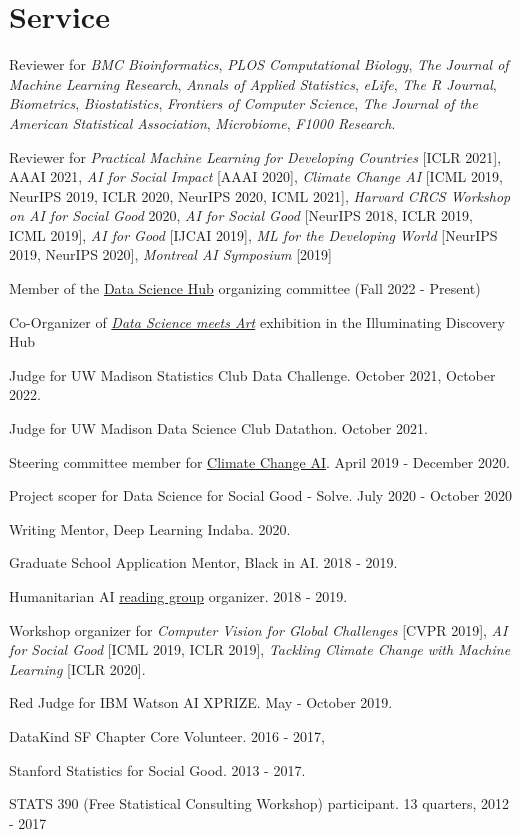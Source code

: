 \documentclass[letterpaper]{article}
\renewenvironment{itemize}{
  \begin{list}{}{
    \setlength{\leftmargin}{1.5em}
  }
}{
  \end{list}
}
\begin{document}
\section*{Service}

\begin{itemize}
\item Reviewer for \textit{BMC Bioinformatics}, \textit{PLOS Computational
Biology}, \textit{The Journal of Machine Learning Research}, \textit{Annals of
Applied Statistics}, \textit{eLife}, \textit{The R Journal},
\textit{Biometrics}, \textit{Biostatistics}, \textit{Frontiers of Computer
Science}, \textit{The Journal of the American Statistical Association},
\textit{Microbiome}, \textit{F1000 Research}.
\item Reviewer for \textit{Practical Machine Learning for Developing Countries}
  [ICLR 2021], AAAI 2021, \textit{AI for Social Impact} [AAAI 2020],
  \textit{Climate Change AI} [ICML 2019, NeurIPS 2019, ICLR 2020, NeurIPS 2020, ICML 2021],
  \textit{Harvard CRCS Workshop on AI for Social Good} 2020, \textit{AI for
    Social Good} [NeurIPS 2018, ICLR 2019, ICML 2019], \textit{AI for Good}
         [IJCAI 2019], \textit{ML for the Developing World} [NeurIPS 2019,
           NeurIPS 2020], \textit{Montreal AI Symposium} [2019]
\item Member of the \href{https://datascience.wisc.edu/hub/}{Data Science Hub} organizing committee (Fall 2022 - Present)
\item Co-Organizer of \href{https://docs.google.com/forms/d/13PVoJdk3yWW9FN_hreEWBN_bqEPNfamr_m0rMKw__Mk/edit}{\textit{Data Science meets Art}} exhibition in the Illuminating Discovery Hub 
\item Judge for UW Madison Statistics Club Data Challenge. October 2021, October 2022.
\item Judge for UW Madison Data Science Club Datathon. October 2021.
\item Steering committee member for \href{https://www.climatechange.ai}{Climate
Change AI}. April 2019 - December 2020.
\item Project scoper for Data Science for Social Good - Solve. July 2020 - October 2020
\item Writing Mentor, Deep Learning Indaba. 2020.
\item Graduate School Application Mentor, Black in AI. 2018 - 2019.
\item Humanitarian AI \href{https://krisrs1128.github.io/Humanitarian-AI/}{reading group} organizer. 2018 - 2019.
\item Workshop organizer for \textit{Computer Vision for Global Challenges}
  [CVPR 2019], \textit{AI for Social Good} [ICML 2019, ICLR 2019],
  \textit{Tackling Climate Change with Machine Learning} [ICLR 2020].
\item Red Judge for IBM Watson AI XPRIZE. May - October 2019.
\item DataKind SF Chapter Core Volunteer. 2016 - 2017,
\item Stanford Statistics for Social Good. 2013 - 2017.
\item STATS 390 (Free Statistical Consulting Workshop) participant. 13 quarters, 2012 - 2017
\end{itemize}
\end{document}
